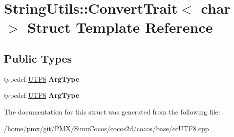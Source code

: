 \hypertarget{structStringUtils_1_1ConvertTrait_3_01char_01_4}{}\section{String\+Utils\+:\+:Convert\+Trait$<$ char $>$ Struct Template Reference}
\label{structStringUtils_1_1ConvertTrait_3_01char_01_4}
\subsection*{Public Types}
\begin{DoxyCompactItemize}
\item 
\mbox{\label{structStringUtils_1_1ConvertTrait_3_01char_01_4_a6607841743ef6541646b7975431afdbe}} 
typedef \hyperlink{structUTF8}{U\+T\+F8} {\bfseries Arg\+Type}
\item 
\mbox{\label{structStringUtils_1_1ConvertTrait_3_01char_01_4_a6607841743ef6541646b7975431afdbe}} 
typedef \hyperlink{structUTF8}{U\+T\+F8} {\bfseries Arg\+Type}
\end{DoxyCompactItemize}


The documentation for this struct was generated from the following file\+:\begin{DoxyCompactItemize}
\item 
/home/pmx/git/\+P\+M\+X/\+Simu\+Cocos/cocos2d/cocos/base/cc\+U\+T\+F8.\+cpp\end{DoxyCompactItemize}
